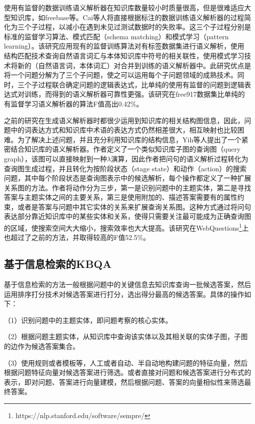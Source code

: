 使用有监督的数据训练语义解析器在知识库数量较小时质量很高，但是很难适应大型知识库，如freebase等。Cai\cite{Cai}等人将直接根据标注的数据训练语义解析器的过程简化为三个子过程，以减小在遇到未见过测试数据时的失败率。这三个子过程分别是标准的监督学习算法、模式匹配（schema matching）和模式学习（pattern learning）。该研究应用现有的监督训练算法对有标签数据集进行语义解析，使用结构匹配技术查询自然语言词汇与本体知识库中符号的相关联性，使用模式学习技术将新的（自然语言词，本体词汇）对合并到训练的语义解析器中。此研究优点是将一个问题分解为了三个子问题，使之可以运用每个子问题领域的成熟技术。同时，三个子过程联合确定问题的逻辑表达式，比单纯的使用有监督的问题到逻辑表达式对训练，而得到的语义解析器可靠性更强。该研究在free917数据集比单纯的有监督学习语义解析器的算法F值高出0.42\%。

之前的研究在生成语义解析器时都很少运用到知识库的相关结构图信息，因此，问题中的词表达方式和知识库中术语的表达方式仍然相差很大，相互映射也比较困难。为了解决上述问题，并且充分利用知识库的结构信息，Yih\cite{Yih}等人提出了一个紧密结合知识库的语义解析器。作者定义了一个类似知识库子图的查询图（query graph），该图可以直接映射到一种$\lambda$演算，因此作者把问句的语义解析过程转化为查询图生成过程，并且转化为按阶段状态（stage state）和动作（action）的搜索问题，其中每个阶段状态是查询图表示中的候选解析，每个操作都定义了一种扩展关系图的方法。作者将动作分为三步，第一是识别问题中的主题实体，第二是寻找答案与主题实体之间的主要关系，第三是使用附加的、描述答案需要有的属性约束，或者是答案与问题中其它实体的关系来扩展查询关系图。这种方式通过将问句表达部分靠近知识库中的某些实体和关系，使得只需要关注最可能成为正确查询图的区域，使搜索空间大大缩小，搜索效率也大大提高。该研究在WebQuestions\footnote{https://nlp.stanford.edu/software/sempre/}上也超过了之前的方法，并取得较高的F值52.5\%。

\subsection{基于信息检索的KBQA}
基于信息检索的方法一般根据问题中的关键信息去知识库查询一批候选答案，然后运用排序打分技术对候选答案进行打分，选出得分最高的候选答案。具体的操作如下：

（1）识别问题中的主题实体，即问题考察的核心实体。

（2）根据问题主题实体，从知识库中查询该实体以及其相关联的实体子图，子图的边作为候选答案集合。

（3）使用规则或者模板等，人工或者自动、半自动地构建问题的特征向量，然后根据问题特征向量对候选答案进行筛选。或者直接对问题和候选答案进行分布式的表示，即对问题、答案进行向量建模，然后根据问题、答案的向量相似性来筛选最终答案。


